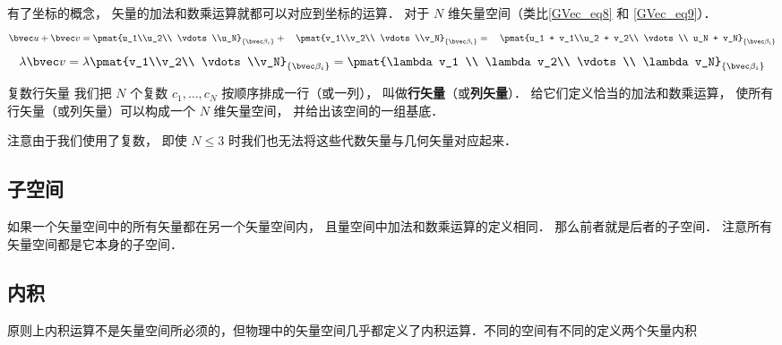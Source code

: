 有了坐标的概念， 矢量的加法和数乘运算就都可以对应到坐标的运算． 对于 $N$ 维矢量空间（类比\autoref{GVec_eq8} 和 \autoref{GVec_eq9}）．
\begin{equation}
\bvec u + \bvec v = \pmat{u_1\\u_2\\ \vdots\\u_N}_{\{\bvec\beta_i\}} + \quad \pmat{v_1\\v_2\\ \vdots \\v_N}_{\{\bvec\beta_i\}} = \quad \pmat{u_1 + v_1\\u_2 + v_2\\ \vdots \\ u_N + v_N}_{\{\bvec\beta_i\}}
\end{equation}
\begin{equation}
\lambda \bvec v = \lambda\pmat{v_1\\v_2\\ \vdots \\v_N}_{\{\bvec\beta_i\}} = \pmat{\lambda v_1 \\ \lambda v_2\\ \vdots \\ \lambda v_N}_{\{\bvec\beta_i\}}
\end{equation}

\begin{exercise}{复数行矢量}
我们把 $N$ 个复数 $c_1, \dots, c_N$ 按顺序排成一行（或一列）， 叫做\textbf{行矢量}（或\textbf{列矢量}）． 给它们定义恰当的加法和数乘运算， 使所有行矢量（或列矢量）可以构成一个 $N$ 维矢量空间， 并给出该空间的一组基底．

注意由于我们使用了复数， 即使 $N \leqslant 3$ 时我们也无法将这些代数矢量与几何矢量对应起来．
\end{exercise}

\subsection{子空间}
如果一个矢量空间中的所有矢量都在另一个矢量空间内， 且量空间中加法和数乘运算的定义相同． 那么前者就是后者的子空间． 注意所有矢量空间都是它本身的子空间．



\subsection{内积}
原则上内积运算不是矢量空间所必须的，但物理中的矢量空间几乎都定义了内积运算．不同的空间有不同的定义两个矢量内积

